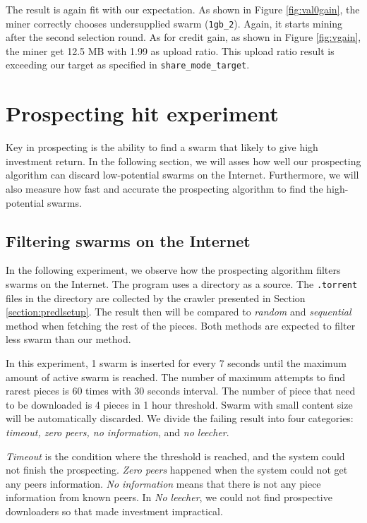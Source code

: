 The result is again fit with our expectation. As shown in Figure \ref{fig:val0gain}, the miner correctly chooses undersupplied swarm (\texttt{1gb\_2}). Again, it starts mining after the second selection round. As for credit gain, as shown in Figure \ref{fig:vgain}, the miner get 12.5 MB with 1.99 as upload ratio. This upload ratio result is exceeding our target as specified in \texttt{share\_mode\_target}. 

\section{Prospecting hit experiment}
\label{section:prospectexp}
Key in prospecting is the ability to find a swarm that likely to give high investment return. In the following section, we will asses how well our prospecting algorithm can discard low-potential swarms on the Internet. Furthermore, we will also measure how fast and accurate the prospecting algorithm to find the high-potential swarms. 



\subsection{Filtering swarms on the Internet}
In the following experiment, we observe how the prospecting algorithm filters swarms on the Internet. The program uses a directory as a source. The \texttt{.torrent} files in the directory are collected by the crawler presented in Section \ref{section:predlsetup}. The result then will be compared to \textit{random} and \textit{sequential} method when fetching the rest of the pieces. Both methods are expected to filter less swarm than our method.


In this experiment, 1 swarm is inserted for every 7 seconds until the maximum amount of active swarm is reached. The number of maximum attempts to find rarest pieces is 60 times with 30 seconds interval. The number of piece that need to be downloaded is 4 pieces in 1 hour threshold. Swarm with small content size will be automatically discarded. We divide the failing result into four categories: \textit{timeout, zero peers, no information}, and \textit{no leecher}.

\textit{Timeout} is the condition where the threshold is reached, and the system could not finish the prospecting. \textit{Zero peers} happened when the system could not get any peers information. \textit{No information} means that there is not any piece information from known peers. In \textit{No leecher}, we could not find prospective downloaders so that made investment impractical. 

